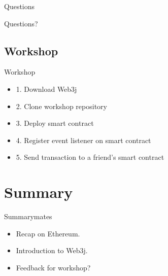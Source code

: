 \documentclass{beamer}
\begin{document}
\begin{frame}{Questions}
	\begin{center}
		Questions?
	\end{center}
\end{frame}

\subsection{Workshop}

\begin{frame}{Workshop}
	\begin{itemize}
		\item {
			1. Download Web3j
		}
		\item {
			2. Clone workshop repository
		}
		\item {
			3. Deploy smart contract
		}
		\item {
			4. Register event listener on smart contract
		}
		\item {
			5. Send transaction to a friend's smart contract
		}
	\end{itemize}
\end{frame}



\section*{Summary}

\begin{frame}{Summary}mates
  \begin{itemize}
  \item
    Recap on \alert{Ethereum}.
  \item
    Introduction to \alert{Web3j}.
  \end{itemize}
  
  \begin{itemize}
  \item
    Feedback for workshop?
  \end{itemize}
\end{frame}



\appendix
\end{document}
